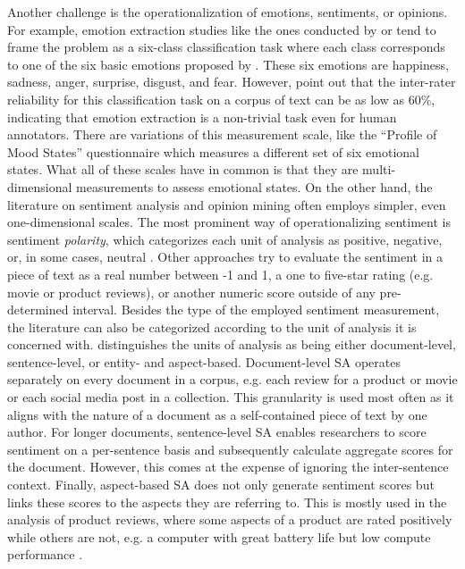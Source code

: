 Another challenge is the operationalization of emotions, sentiments, or opinions. For example, emotion extraction studies like the ones conducted by  or  tend to frame the problem as a six-class classification task where each class corresponds to one of the six basic emotions proposed by . These six emotions are happiness, sadness, anger, surprise, disgust, and fear. However,  point out that the inter-rater reliability for this classification task on a corpus of text can be as low as 60\%, indicating that emotion extraction is a non-trivial task even for human annotators. There are variations of this measurement scale, like the ``Profile of Mood States'' questionnaire  which measures a different set of six emotional states. What all of these scales have in common is that they are multi-dimensional measurements to assess emotional states. \newline
On the other hand, the literature on sentiment analysis and opinion mining often employs simpler, even one-dimensional scales. The most prominent way of operationalizing sentiment is sentiment \emph{polarity}, which categorizes each unit of analysis as positive, negative, or, in some cases, neutral \cite{ravi2015survey}. Other approaches try to evaluate the sentiment in a piece of text as a real number between -1 and 1, a one to five-star rating (e.g. movie or product reviews), or another numeric score outside of any pre-determined interval.\newline
Besides the type of the employed sentiment measurement, the literature can also be categorized according to the unit of analysis it is concerned with.  distinguishes the units of analysis as being either document-level, sentence-level, or entity- and aspect-based. Document-level SA operates separately on every document in a corpus, e.g. each review for a product or movie or each social media post in a collection. This granularity is used most often as it aligns with the nature of a document as a self-contained piece of text by one author. For longer documents, sentence-level SA enables researchers to score sentiment on a per-sentence basis and subsequently calculate aggregate scores for the document. However, this comes at the expense of ignoring the inter-sentence context. Finally, aspect-based SA does not only generate sentiment scores but links these scores to the aspects they are referring to. This is mostly used in the analysis of product reviews, where some aspects of a product are rated positively while others are not, e.g. a computer with great battery life but low compute performance .

